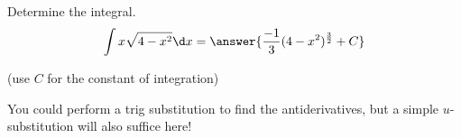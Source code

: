 \documentclass{ximera}
\author{Jason Miller}
\begin{document}
\begin{exercise}
Determine the integral.
\[
\int x\sqrt{4-x^{2}} \d x=\answer{ \frac{-1}{3}(4-x^{2})^{\frac{3}{2}}     +C   }
\]

(use $C$ for the constant of integration)

\begin{feedback}
You could perform a trig substitution to find the antiderivatives, but a simple $u$-substitution will also suffice here!
\end{feedback}

\end{exercise}
\end{document}
